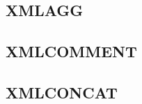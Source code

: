 \subsection{XMLAGG}
\label{sec:xml.xml_agg}

\subsection{XMLCOMMENT}
\label{sec:xml.xml_comment}

\subsection{XMLCONCAT}
\label{sec:xml.xml_concat}
